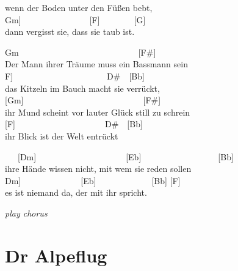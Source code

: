 \documentclass[
  letterpaper,
  a5paper]{memoir}
\begin{document}
\begin{tcolorbox}[enhanced jigsaw, breakable, bottomrule=.15mm, colframe=quarto-callout-color-frame, rightrule=.15mm, opacityback=0, colback=white, arc=.35mm, toprule=.15mm, leftrule=.75mm, left=2mm]
wenn der Boden unter den Füßen bebt,\\
\hspace*{0.333em}\hspace*{0.333em}\hspace*{0.333em}\hspace*{0.333em}\hspace*{0.333em}\hspace*{0.333em}\hspace*{0.333em}\hspace*{0.333em}{[}Gm{]}~~~~~~~~~~~~~~~~{[}F{]}~~~~~~~~{[}G{]}\\
dann vergisst sie, dass sie taub ist.

\end{tcolorbox}

Gm~~~~~~~~~~~~~~~~~~~~~~~~~~~~{[}F\#{]}\\
Der Mann ihrer Träume muss ein Bassmann sein\\
\hspace*{0.333em}\hspace*{0.333em}\hspace*{0.333em}\hspace*{0.333em}\hspace*{0.333em}\hspace*{0.333em}{[}F{]}~~~~~~~~~~~~~~~~~~~~~~D\#~~{[}Bb{]}\\
das Kitzeln im Bauch macht sie verrückt,\\
{[}Gm{]}~~~~~~~~~~~~~~~~~~~~~~~~~~~~{[}F\#{]}\\
ihr Mund scheint vor lauter Glück still zu schrei\textquotesingle n\\
{[}F{]}~~~~~~~~~~~~~~~~~~~~~D\#~~{[}Bb{]}\\
ihr Blick ist der Welt entrückt

~~~{[}Dm{]}~~~~~~~~~~~~~~~~~~~~~{[}Eb{]}~~~~~~~~~~~~~~~~~~{[}Bb{]}\\
ihre Hände wissen nicht, mit wem sie reden sollen\\
\hspace*{0.333em}\hspace*{0.333em}\hspace*{0.333em}{[}Dm{]}~~~~~~~~~~~~~~{[}Eb{]}~~~~~~~~~~~~~{[}Bb{]}
{[}F{]}\\
es ist niemand da, der mit ihr spricht.

\emph{play chorus}

\hypertarget{dr-alpeflug}{%
\chapter{Dr Alpeflug}\label{dr-alpeflug}}
\end{document}
